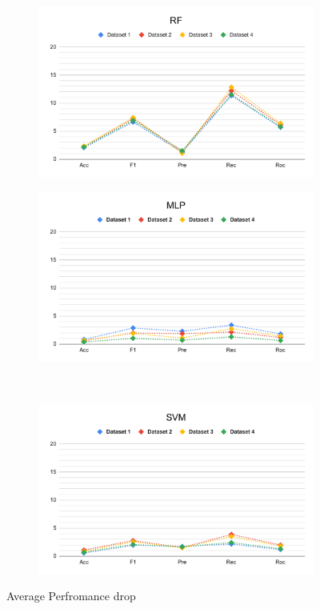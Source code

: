 \begin{figure}[H]
\begin{subfigure}{.5\columnwidth}
    \includegraphics[width=0.9\columnwidth]{media/data/performance_delta/delta_RF.pdf}
    \caption{}
    \label{fig:perfromance_delta_rf}
  \end{subfigure}%
  \begin{subfigure}{.5\columnwidth}
    \centering
    \includegraphics[width=0.9\columnwidth]{media/data/performance_delta/delta_MLP.pdf}
    \caption{}
    \label{fig:perfromance_delta_mlp}
  \end{subfigure}\\%
  \begin{subfigure}{.5\columnwidth}
    \centering
    \includegraphics[width=0.9\columnwidth]{media/data/performance_delta/delta_SVM.pdf}
    \caption{}
    \label{fig:perfromance_delta_svm}
  \end{subfigure}
  \caption{Average Perfromance drop}
  \label{fig:perfromance_delta}
\end{figure}

